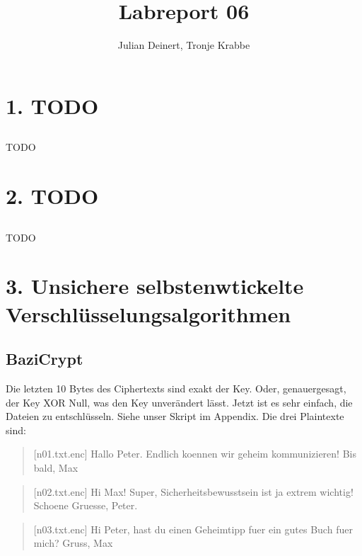 \documentclass[10pt,a4paper]{article}
\author{Julian Deinert, Tronje Krabbe}
\title{Labreport 06}
\begin{document}
\maketitle
\tableofcontents
\thispagestyle{empty}
\newpage
\setcounter{page}{1}


\section*{1. TODO}
\setcounter{subsection}{1}

\subsection{}
TODO

\setcounter{section}{2}
\section*{2. TODO}
\setcounter{subsection}{0}
\subsection{}
TODO

\setcounter{section}{3}
\section*{3. Unsichere selbstenwtickelte Verschlüsselungsalgorithmen}
\setcounter{subsection}{0}
\subsection{BaziCrypt}
Die letzten 10 Bytes des Ciphertexts sind exakt der Key. Oder, genauergesagt, der Key XOR Null,
was den Key unverändert lässt. Jetzt ist es sehr einfach, die Dateien zu entschlüsseln. Siehe
unser Skript im Appendix. Die drei Plaintexte sind:
\begin{quote}[n01.txt.enc]
Hallo Peter. Endlich koennen wir geheim kommunizieren! Bis bald, Max
\end{quote}
\begin{quote}[n02.txt.enc]
Hi Max! Super, Sicherheitsbewusstsein ist ja extrem wichtig! Schoene Gruesse, Peter.
\end{quote}
\begin{quote}[n03.txt.enc]
Hi Peter, hast du einen Geheimtipp fuer ein gutes Buch fuer mich? Gruss, Max
\end{quote}
\end{document}
